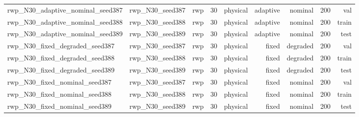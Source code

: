 \begin{tabular}{lrrrrrrrr}
rwp\_N30\_adaptive\_nominal\_seed387 & rwp\_N30\_seed387 & rwp & 30 & physical & adaptive & nominal & 200 & val \\
rwp\_N30\_adaptive\_nominal\_seed388 & rwp\_N30\_seed388 & rwp & 30 & physical & adaptive & nominal & 200 & train \\
rwp\_N30\_adaptive\_nominal\_seed389 & rwp\_N30\_seed389 & rwp & 30 & physical & adaptive & nominal & 200 & test \\
rwp\_N30\_fixed\_degraded\_seed387 & rwp\_N30\_seed387 & rwp & 30 & physical & fixed & degraded & 200 & val \\
rwp\_N30\_fixed\_degraded\_seed388 & rwp\_N30\_seed388 & rwp & 30 & physical & fixed & degraded & 200 & train \\
rwp\_N30\_fixed\_degraded\_seed389 & rwp\_N30\_seed389 & rwp & 30 & physical & fixed & degraded & 200 & test \\
rwp\_N30\_fixed\_nominal\_seed387 & rwp\_N30\_seed387 & rwp & 30 & physical & fixed & nominal & 200 & val \\
rwp\_N30\_fixed\_nominal\_seed388 & rwp\_N30\_seed388 & rwp & 30 & physical & fixed & nominal & 200 & train \\
rwp\_N30\_fixed\_nominal\_seed389 & rwp\_N30\_seed389 & rwp & 30 & physical & fixed & nominal & 200 & test \\
\bottomrule
\end{tabular}